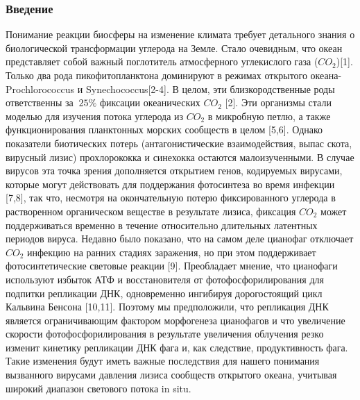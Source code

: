 \documentclass[a4paper,12pt]{article}
\begin{document}
    \subsubsection{Введение}
        \par{Понимание реакции биосферы на изменение климата требует детального знания о биологической трансформации
        углерода на Земле. Стало очевидным, что океан представляет собой важный поглотитель атмосферного углекислого газа
        ($CO_2$)[1]. Только два рода пикофитопланктона доминируют в режимах открытого океана-Prochlorococcus и
        Synechococcus[2-4]. В целом, эти близкородственные роды ответственны за $ ~25\% $ фиксации океанических $CO_2$
        [2]. Эти организмы стали моделью для изучения потока углерода из $CO_2$ в микробную петлю, а также
        функционирования планктонных морских сообществ в целом [5,6]. Однако показатели биотических потерь
        (антагонистические взаимодействия, выпас скота, вирусный лизис) прохлорококка и синехокка остаются
        малоизученными. В случае вирусов эта точка зрения дополняется открытием генов, кодируемых вирусами, которые могут
        действовать для поддержания фотосинтеза во время инфекции [7,8], так что, несмотря на окончательную потерю
        фиксированного углерода в растворенном органическом веществе в результате лизиса, фиксация $CO_2$ может
        поддерживаться временно в течение относительно длительных латентных периодов вируса. Недавно было показано, что
        на самом деле цианофаг отключает $CO_2$ инфекцию на ранних стадиях заражения, но при этом поддерживает
        фотосинтетические световые реакции [9]. Преобладает мнение, что цианофаги используют избыток АТФ и восстановителя
        от фотофосфорилирования для подпитки репликации ДНК, одновременно ингибируя дорогостоящий цикл Кальвина Бенсона
        [10,11]. Поэтому мы предположили, что репликация ДНК является ограничивающим фактором морфогенеза цианофагов и
        что увеличение скорости фотофосфорилирования в результате увеличения облучения резко изменит кинетику репликации
        ДНК фага и, как следствие, продуктивность фага. Такие изменения будут иметь важные последствия для нашего
        понимания вызванного вирусами давления лизиса сообществ открытого океана, учитывая широкий диапазон светового
        потока in situ. \cite{puxty-evanx}}
\end{document}
